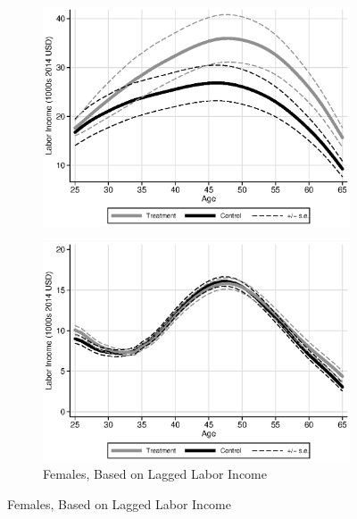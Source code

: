 \begin{figure}
\begin{subfigure}[h]{0.35\textwidth}
		\includegraphics[width=\textwidth]{output/labor_25-60_female_2}
\end{subfigure}%
\begin{subfigure}[h]{0.35\textwidth}
		\centering
		\caption{Females, Based on Lagged Labor Income}
		\includegraphics[width=\textwidth]{output/labor_25-60_female_3}
\end{subfigure}
\footnotesize \justify

\end{figure}
